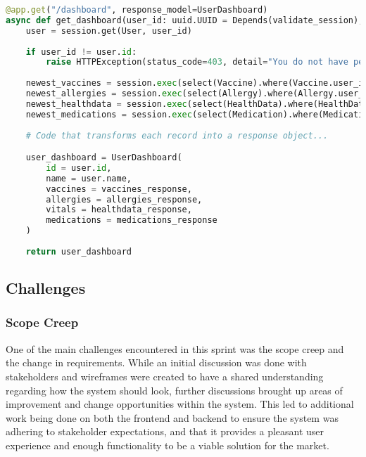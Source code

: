 \begin{lstlisting}[language=Python, caption=Dashboard Endpoint]
@app.get("/dashboard", response_model=UserDashboard)
async def get_dashboard(user_id: uuid.UUID = Depends(validate_session), session: Session = Depends(get_session)):
    user = session.get(User, user_id)
    
    if user_id != user.id:
        raise HTTPException(status_code=403, detail="You do not have permission to access this endpoint!")   
    
    newest_vaccines = session.exec(select(Vaccine).where(Vaccine.user_id == user_id).order_by(col(Vaccine.date_added).desc()).limit(5)).all()
    newest_allergies = session.exec(select(Allergy).where(Allergy.user_id == user_id).order_by(col(Allergy.date_added).desc()).limit(5)).all()
    newest_healthdata = session.exec(select(HealthData).where(HealthData.user_id == user_id).order_by(col(HealthData.date_added).desc()).limit(5)).all()
    newest_medications = session.exec(select(Medication).where(Medication.user_id == user_id).order_by(col(Medication.date_added).desc()).limit(5)).all()
    
    # Code that transforms each record into a response object...

    user_dashboard = UserDashboard(
        id = user.id,
        name = user.name,
        vaccines = vaccines_response,
        allergies = allergies_response,
        vitals = healthdata_response,
        medications = medications_response
    )
    
    return user_dashboard
\end{lstlisting}

\subsection{Challenges}

\subsubsection{Scope Creep}

One of the main challenges encountered in this sprint was the scope creep and the change in requirements. While an initial discussion was done with stakeholders and wireframes were created to have a shared understanding regarding how the system should look, further discussions brought up areas of improvement and change opportunities within the system. This led to additional work being done on both the frontend and backend to ensure the system was adhering to stakeholder expectations, and that it provides a pleasant user experience and enough functionality to be a viable solution for the market.

